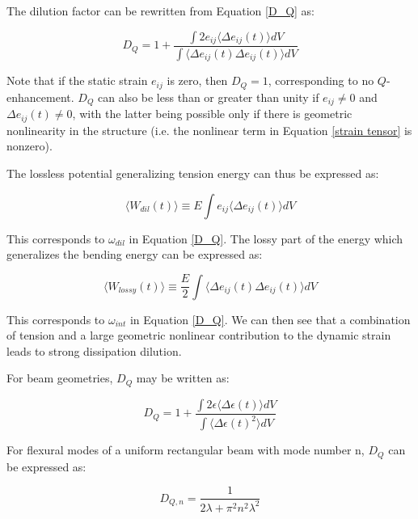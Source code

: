 \documentclass[%
 reprint,
nofootinbib,
 amsmath,amssymb,
 aps,
]{revtex4-2}
\begin{document}
The dilution factor can be rewritten from Equation \ref{D_Q} as:

\begin{equation}
    D_Q = 1 + \frac{\int 2e_{ij} \big \langle \Delta e_{ij}(t) \big \rangle dV}{\int \big \langle \Delta e_{ij}(t)\Delta e_{ij}(t) \big \rangle dV}
\end{equation}

Note that if the static strain $e_{ij}$ is zero, then $D_Q = 1$, corresponding to no $Q$-enhancement. $D_Q$ can also be less than or greater than unity if $e_{ij} \neq 0$ and $\Delta e_{ij}(t) \neq 0$, with the latter being possible only if there is geometric nonlinearity in the structure (i.e. the nonlinear term in Equation \ref{strain tensor} is nonzero). 
\newline

The lossless potential generalizing tension energy can thus be expressed as:

\begin{equation*}
    \Big \langle W_{dil}(t) \Big \rangle \equiv E \int e_{ij} \Big \langle \Delta e_{ij}(t) \Big \rangle dV
\end{equation*}

This corresponds to $\omega_{dil}$ in Equation \ref{D_Q}. The lossy part of the energy which generalizes the bending energy can be expressed as:

\begin{equation*}
    \Big \langle W_{lossy}(t) \Big \rangle \equiv \frac{E}{2} \int\Big \langle \Delta e_{ij}(t) \Delta e_{ij}(t) \Big \rangle dV
\end{equation*}

This corresponds to $\omega_{int}$ in Equation \ref{D_Q}. We can then see that a combination of tension and a large geometric nonlinear contribution to the dynamic strain leads to strong dissipation dilution.
\newline

For beam geometries, $D_Q$ may be written as:

\begin{equation*}
    D_Q = 1 + \frac{\int 2\epsilon \big \langle \Delta \epsilon(t) \big \rangle dV}{\int \big \langle \Delta \epsilon(t)^2 \big \rangle dV}
\end{equation*}

For flexural modes of a uniform rectangular beam with mode number n, $D_Q$ can be expressed as:

\begin{equation*}
    D_{Q,n} = \frac{1}{2\lambda + \pi^2 n^2 \lambda^2}
\end{equation*}
\end{document}
